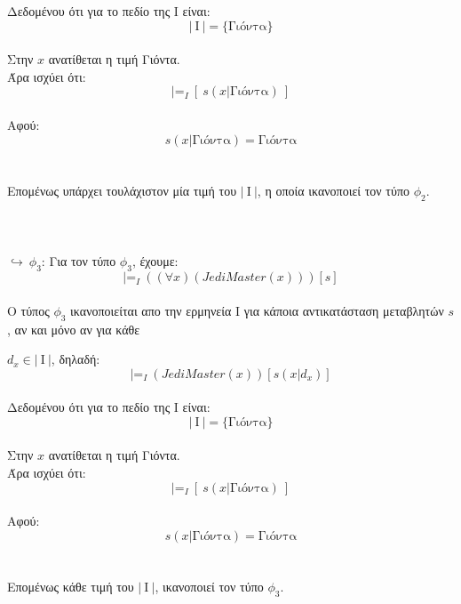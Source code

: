 \documentclass[10pt]{article}
\begin{document}
Δεδομένου ότι για το πεδίο της
I είναι:
\[
\lvert \ \text{Ι} \ \rvert = \{\text{Γιόντα} \}
\] \\

Στην $x$ ανατίθεται η τιμή Γιόντα.\\

Άρα ισχύει ότι: \\
\[
|\text{=}_{I} \ [\ s(x|\text{Γιόντα})\ ]
\] \\

Αφού:\\
\[
s(x|\text{Γιόντα}) = \text{Γιόντα}
\] \\ \\

Επομένως υπάρχει τουλάχιστον μία τιμή του $\lvert \ \text{Ι} \ \rvert $, η οποία ικανοποιεί τον τύπο $\phi_2$.   \\ \\ \\ \\
$\hookrightarrow  \ \phi_3$: Για τον τύπο $\phi_3$, έχουμε:
\\ 
\[
|\text{=}_{I} \ ((\forall x) (JediMaster(x)))[s]
\] \\

Ο τύπος $\phi_{3}$ ικανοποιείται απο την ερμηνεία Ι για κάποια αντικατάσταση μεταβλητών $s$, αν και μόνο αν για κάθε

$d_x \in \lvert \ \text{Ι} \ \rvert$, δηλαδή:\\
\[
|\text{=}_{I} \ (JediMaster(x))[s(x|d_x)]
\] \\

Δεδομένου ότι για το πεδίο της
I είναι:
\[
\lvert \ \text{Ι} \ \rvert = \{\text{Γιόντα} \}
\] \\

Στην $x$ ανατίθεται η τιμή Γιόντα.\\

Άρα ισχύει ότι: \\
\[
|\text{=}_{I} \ [\ s(x|\text{Γιόντα})\ ]
\] \\

Αφού:\\
\[
s(x|\text{Γιόντα}) = \text{Γιόντα}
\] \\ \\

Επομένως κάθε τιμή του $\lvert \ \text{Ι} \ \rvert $, ικανοποιεί τον τύπο $\phi_3$.
\\ \\ \\
\end{document}
